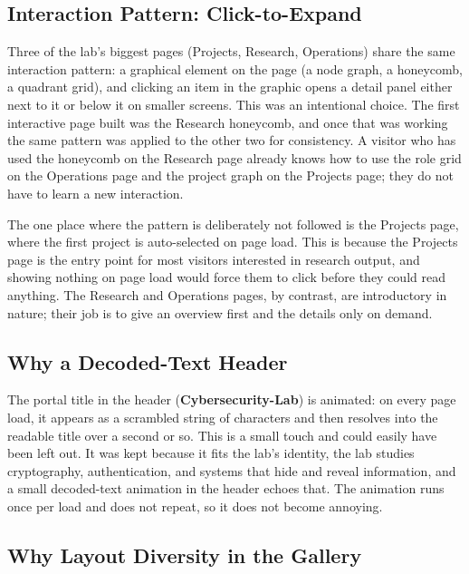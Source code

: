 \subsection{Interaction Pattern: Click-to-Expand}\label{subsec:dev-design-interaction}

Three of the lab's biggest pages (Projects, Research, Operations) share the same interaction pattern: a graphical element on the page (a node graph, a honeycomb, a quadrant grid), and clicking an item in the graphic opens a detail panel either next to it or below it on smaller screens. This was an intentional choice. The first interactive page built was the Research honeycomb, and once that was working the same pattern was applied to the other two for consistency. A visitor who has used the honeycomb on the Research page already knows how to use the role grid on the Operations page and the project graph on the Projects page; they do not have to learn a new interaction.

The one place where the pattern is deliberately not followed is the Projects page, where the first project is auto-selected on page load. This is because the Projects page is the entry point for most visitors interested in research output, and showing nothing on page load would force them to click before they could read anything. The Research and Operations pages, by contrast, are introductory in nature; their job is to give an overview first and the details only on demand.

\subsection{Why a Decoded-Text Header}\label{subsec:dev-design-header}

The portal title in the header (\textbf{Cybersecurity-Lab}) is animated: on every page load, it appears as a scrambled string of characters and then resolves into the readable title over a second or so. This is a small touch and could easily have been left out. It was kept because it fits the lab's identity, the lab studies cryptography, authentication, and systems that hide and reveal information, and a small decoded-text animation in the header echoes that. The animation runs once per load and does not repeat, so it does not become annoying.

\subsection{Why Layout Diversity in the Gallery}\label{subsec:dev-design-gallery}

